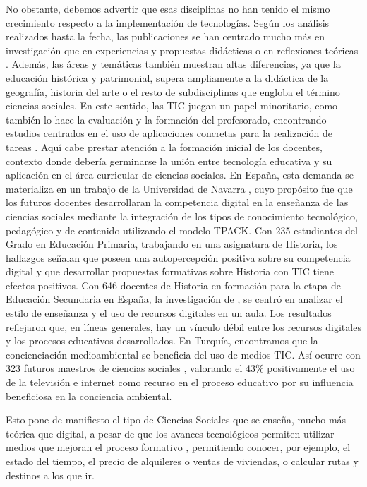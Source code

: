 \documentclass[spanish]{textolivre}
\begin{document}
No obstante, debemos advertir que esas disciplinas no han tenido el mismo crecimiento respecto a la implementación de tecnologías. Según los análisis realizados hasta la fecha, las publicaciones se han centrado mucho más en investigación que en experiencias y propuestas didácticas o en reflexiones teóricas \cite{alonso22, mcdougall2006theory}. Además, las áreas y temáticas también muestran altas diferencias, ya que la educación histórica y patrimonial, supera ampliamente a la didáctica de la geografía, historia del arte o el resto de subdisciplinas que engloba el término ciencias sociales. En este sentido, las TIC juegan un papel minoritario, como también lo hace la evaluación \cite{martinez2021} y la formación del profesorado, encontrando estudios centrados en el uso de aplicaciones concretas para la realización de tareas \cite{aguilar2022covid}. Aquí cabe prestar atención a la formación inicial de los docentes, contexto donde debería germinarse la unión entre tecnología educativa y su aplicación en el área curricular de ciencias sociales. En España, esta demanda se materializa en un trabajo de la Universidad de Navarra \cite{ciriza2022technological}, cuyo propósito fue que los futuros docentes desarrollaran la competencia digital en la enseñanza de las ciencias sociales mediante la integración de los tipos de conocimiento tecnológico, pedagógico y de contenido utilizando el modelo TPACK. Con 235 estudiantes del Grado en Educación Primaria, trabajando en una asignatura de Historia, los hallazgos señalan que poseen una autopercepción positiva sobre su competencia digital y que desarrollar propuestas formativas sobre Historia con TIC tiene efectos positivos. Con 646 docentes de Historia en formación para la etapa de Educación Secundaria en España, la investigación de \cite{gomez2022recursos}, se centró en analizar el estilo de enseñanza y el uso de recursos digitales en un aula. Los resultados reflejaron que, en líneas generales, hay un vínculo débil entre los recursos digitales y los procesos educativos desarrollados. En Turquía, encontramos que la concienciación medioambiental se beneficia del uso de medios TIC. Así ocurre con 323 futuros maestros de ciencias sociales \cite{sadik2014study}, valorando el 43\% positivamente el uso de la televisión e internet como recurso en el proceso educativo por su influencia beneficiosa en la conciencia ambiental. 

Esto pone de manifiesto el tipo de Ciencias Sociales que se enseña, mucho más teórica que digital, a pesar de que los avances tecnológicos permiten utilizar medios que mejoran el proceso formativo \cite{jdaitawi2022factors, olivas2022strategic}, permitiendo conocer, por ejemplo, el estado del tiempo, el precio de alquileres o ventas de viviendas, o calcular rutas y destinos a los que ir.
\end{document}
